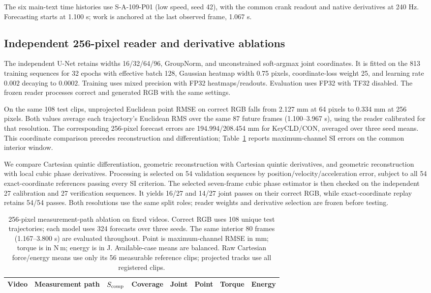 \documentclass[10pt,twocolumn,letterpaper]{article}
\begin{document}
The six main-text time histories use S-A-109-P01 (low speed, seed 42), with the common crank readout and native derivatives at 240 Hz. Forecasting starts at 1.100 s; work is anchored at the last observed frame, 1.067 s.

\subsection{Independent 256-pixel reader and derivative ablations}
The independent U-Net retains widths 16/32/64/96, GroupNorm, and unconstrained soft-argmax joint coordinates. It is fitted on the 813 training sequences for 32 epochs with effective batch 128, Gaussian heatmap width 0.75 pixels, coordinate-loss weight 25, and learning rate $0.002$ decaying to $0.0002$. Training uses mixed precision with FP32 heatmaps/readouts. Evaluation uses FP32 with TF32 disabled. The frozen reader processes correct and generated RGB with the same settings.

On the same 108 test clips, unprojected Euclidean point RMSE on correct RGB falls from 2.127 mm at 64 pixels to 0.334 mm at 256 pixels. Both values average each trajectory's Euclidean RMS over the same 87 future frames (1.100--3.967 s), using the reader calibrated for that resolution. The corresponding 256-pixel forecast errors are 194.994/208.454 mm for KeyCLD/CON, averaged over three seed means. This coordinate comparison precedes reconstruction and differentiation; Table~\ref{app:resolution-reader} reports maximum-channel SI errors on the common interior window.

We compare Cartesian quintic differentiation, geometric reconstruction with Cartesian quintic derivatives, and geometric reconstruction with local cubic phase derivatives. Processing is selected on 54 validation sequences by position/velocity/acceleration error, subject to all 54 exact-coordinate references passing every SI criterion. The selected seven-frame cubic phase estimator is then checked on the independent 27 calibration and 27 verification sequences. It yields 16/27 and 14/27 joint passes on their correct RGB, while exact-coordinate replay retains 54/54 passes. Both resolutions use the same split roles; reader weights and derivative selection are frozen before testing.

\begin{table}[t]
\caption{256-pixel measurement-path ablation on fixed videos. Correct RGB uses 108 unique test trajectories; each model uses 324 forecasts over three seeds. The same interior 80 frames (1.167--3.800 s) are evaluated throughout. Point is maximum-channel RMSE in mm; torque is in N\,m; energy is in J. Available-case means are balanced. Raw Cartesian force/energy means use only its 56 measurable reference clips; projected tracks use all registered clips.}
\label{app:resolution-reader}
\centering\small
\setlength{\tabcolsep}{4pt}
\begin{tabular}{llrrrrrr}
\toprule
Video & Measurement path & $S_{\rm comp}$ & Coverage & Joint & Point & Torque & Energy\\
\midrule

\bottomrule
\end{tabular}
\end{table}
\end{document}
